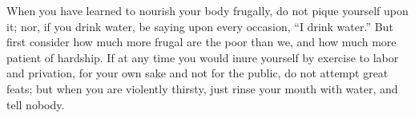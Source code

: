 When you have learned to nourish your body frugally, do not pique
yourself upon it; nor, if you drink water, be saying upon every occasion,
``I drink water.'' But first consider how much more frugal are the poor
than we, and how much more patient of hardship. If at any time you would
inure yourself by exercise to labor and privation, for your own sake and
not for the public, do not attempt great feats; but when you are
violently thirsty, just rinse your mouth with water, and tell nobody.
